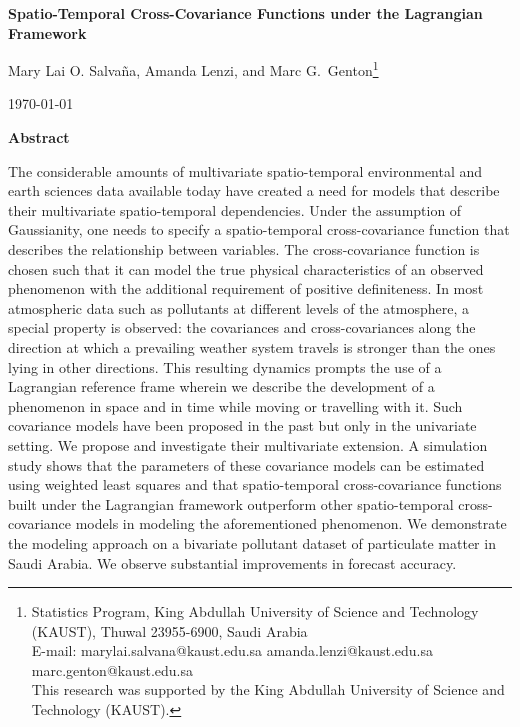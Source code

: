 \documentclass[12pt]{article}
\newcommand{\0}{\mathbf{0}}
\begin{document}
\thispagestyle{empty} \baselineskip=28pt \vskip 5mm
\begin{center} {\LARGE{\bf Spatio-Temporal Cross-Covariance Functions under the Lagrangian Framework}}
	
\end{center}

\baselineskip=12pt \vskip 10mm

\begin{center}\large
Mary Lai O. Salva\~{n}a, Amanda Lenzi, and Marc G.~Genton\footnote[1]{\baselineskip=10pt Statistics Program, King Abdullah University of Science and Technology (KAUST), Thuwal 23955-6900, Saudi Arabia\\
E-mail: marylai.salvana@kaust.edu.sa amanda.lenzi@kaust.edu.sa marc.genton@kaust.edu.sa\\
This research was supported by the King Abdullah University of Science and Technology (KAUST).}
\end{center}

\baselineskip=17pt \vskip 10mm \centerline{\today} \vskip 15mm

\begin{center}
{\large{\bf Abstract}}
\end{center} 
The considerable amounts of multivariate spatio-temporal environmental and earth sciences data available today have created a need for models that describe their multivariate spatio-temporal dependencies. Under the assumption of Gaussianity, one needs to specify a spatio-temporal cross-covariance function that describes the relationship between variables. The cross-covariance function is chosen such that it can model the true physical characteristics of an observed phenomenon with the additional requirement of positive definiteness. In most atmospheric data such as pollutants at different levels of the atmosphere, a special property is observed: the covariances and cross-covariances along the direction at which a prevailing weather system travels is stronger than the ones lying in other directions. This resulting dynamics prompts the use of a Lagrangian reference frame wherein we describe the development of a phenomenon in space and in time while moving or travelling with it. Such covariance models have been proposed in the past but only in the univariate setting. We propose and investigate their multivariate extension. A simulation study shows that the parameters of these covariance models can be estimated using weighted least squares and that spatio-temporal cross-covariance functions built under the Lagrangian framework outperform other spatio-temporal cross-covariance models in modeling the aforementioned phenomenon. We demonstrate the modeling approach on a bivariate pollutant dataset of particulate matter in Saudi Arabia. We observe substantial improvements in forecast accuracy. 
\baselineskip=14pt
\end{document}
